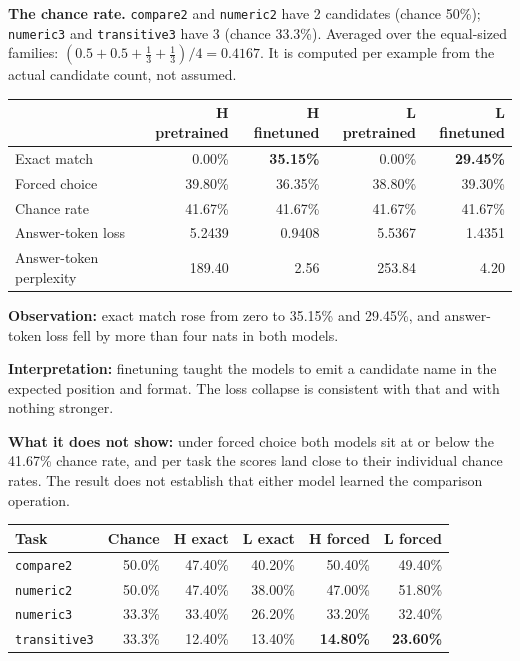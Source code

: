 \documentclass[11pt]{report}
\begin{document}
\begin{keypoint}
\textbf{The chance rate.} \texttt{compare2} and \texttt{numeric2} have 2
candidates (chance 50\%); \texttt{numeric3} and \texttt{transitive3} have 3
(chance 33.3\%). Averaged over the equal-sized families:
$(0.5 + 0.5 + \tfrac13 + \tfrac13)/4 = \mathbf{0.4167}$. It is computed per
example from the actual candidate count, not assumed.
\end{keypoint}

\begin{center}\small
\begin{tabular}{lrrrr}
\toprule
& \textbf{H pretrained} & \textbf{H finetuned} & \textbf{L pretrained} & \textbf{L finetuned} \\
\midrule
Exact match & 0.00\% & \textbf{35.15\%} & 0.00\% & \textbf{29.45\%} \\
Forced choice & 39.80\% & 36.35\% & 38.80\% & 39.30\% \\
Chance rate & 41.67\% & 41.67\% & 41.67\% & 41.67\% \\
Answer-token loss & 5.2439 & 0.9408 & 5.5367 & 1.4351 \\
Answer-token perplexity & 189.40 & 2.56 & 253.84 & 4.20 \\
\bottomrule
\end{tabular}
\end{center}

\begin{sayit}
\textbf{Observation:} exact match rose from zero to 35.15\% and 29.45\%, and
answer-token loss fell by more than four nats in both models.

\smallskip
\textbf{Interpretation:} finetuning taught the models to emit a candidate name
in the expected position and format. The loss collapse is consistent with that
and with nothing stronger.

\smallskip
\textbf{What it does not show:} under forced choice both models sit at or below
the 41.67\% chance rate, and per task the scores land close to their individual
chance rates. The result does not establish that either model learned the
comparison operation.
\end{sayit}

\begin{center}\small
\begin{tabular}{lrrrrr}
\toprule
\textbf{Task} & \textbf{Chance} & \textbf{H exact} & \textbf{L exact} & \textbf{H forced} & \textbf{L forced} \\
\midrule
\texttt{compare2} & 50.0\% & 47.40\% & 40.20\% & 50.40\% & 49.40\% \\
\texttt{numeric2} & 50.0\% & 47.40\% & 38.00\% & 47.00\% & 51.80\% \\
\texttt{numeric3} & 33.3\% & 33.40\% & 26.20\% & 33.20\% & 32.40\% \\
\texttt{transitive3} & 33.3\% & 12.40\% & 13.40\% & \textbf{14.80\%} & \textbf{23.60\%} \\
\bottomrule
\end{tabular}
\end{center}
\end{document}
